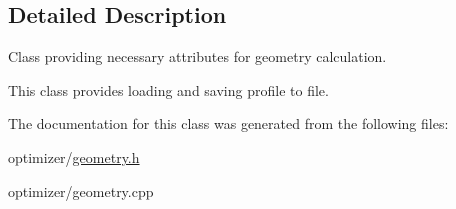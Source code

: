 \subsection{Detailed Description}
Class providing necessary attributes for geometry calculation. 

This class provides loading and saving profile to file. 

The documentation for this class was generated from the following files\+:\begin{DoxyCompactItemize}
\item 
optimizer/\hyperlink{geometry_8h}{geometry.\+h}\item 
optimizer/geometry.\+cpp\end{DoxyCompactItemize}
